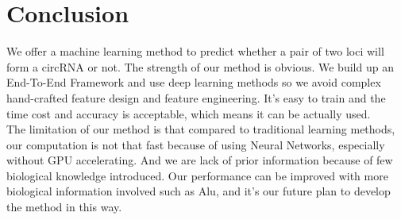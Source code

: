 \documentclass[paper=a4, fontsize=11pt] {scrartcl} %
\numberwithin{equation}{section} %
\numberwithin{figure}{section} %
\numberwithin{table}{section} %
\begin{document}
\section{Conclusion}

We offer a machine learning method to predict whether a pair of two loci will form a circRNA or not. The strength of our method is obvious. We build up an End-To-End Framework and use deep learning methods so we avoid complex hand-crafted feature design and feature engineering. It's easy to train and the time cost and accuracy is acceptable, which means it can be actually used.\\

The limitation of our method is that compared to traditional learning methods, our computation is not that fast because of using Neural Networks, especially without GPU accelerating. And we are lack of  prior information because of few biological knowledge introduced. Our performance can be improved with more biological information involved such as Alu, and it's our future plan to develop the method in this way.\\

\nocite{*}

\end{document}
